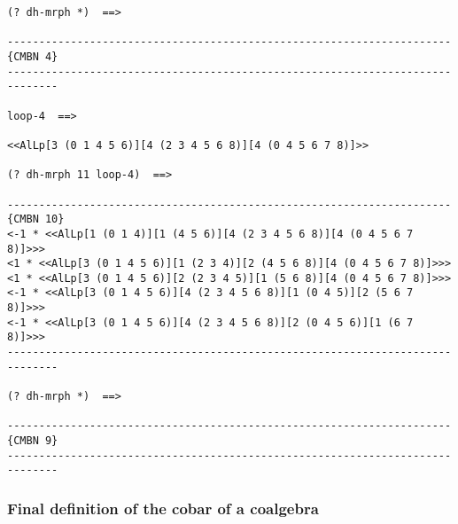 {\footnotesize\begin{verbatim}
(? dh-mrph *)  ==>

----------------------------------------------------------------------{CMBN 4}
------------------------------------------------------------------------------

loop-4  ==>

<<AlLp[3 (0 1 4 5 6)][4 (2 3 4 5 6 8)][4 (0 4 5 6 7 8)]>>

(? dh-mrph 11 loop-4)  ==>

----------------------------------------------------------------------{CMBN 10}
<-1 * <<AlLp[1 (0 1 4)][1 (4 5 6)][4 (2 3 4 5 6 8)][4 (0 4 5 6 7 8)]>>>
<1 * <<AlLp[3 (0 1 4 5 6)][1 (2 3 4)][2 (4 5 6 8)][4 (0 4 5 6 7 8)]>>>
<1 * <<AlLp[3 (0 1 4 5 6)][2 (2 3 4 5)][1 (5 6 8)][4 (0 4 5 6 7 8)]>>>
<-1 * <<AlLp[3 (0 1 4 5 6)][4 (2 3 4 5 6 8)][1 (0 4 5)][2 (5 6 7 8)]>>>
<-1 * <<AlLp[3 (0 1 4 5 6)][4 (2 3 4 5 6 8)][2 (0 4 5 6)][1 (6 7 8)]>>>
------------------------------------------------------------------------------

(? dh-mrph *)  ==>

----------------------------------------------------------------------{CMBN 9}
------------------------------------------------------------------------------
\end{verbatim}}

\subsubsection {Final definition of the cobar of a coalgebra}

